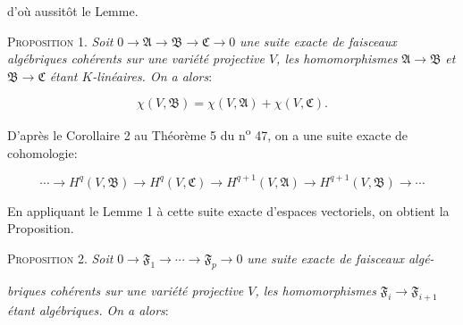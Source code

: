 d'où aussitôt le Lemme.

\textsc{Proposition} 1. \textit{Soit} $0 \rightarrow \mathfrak{A} \rightarrow \mathfrak{B} \rightarrow \mathfrak{C} \rightarrow 0$ \textit{une suite exacte de faisceaux algébriques cohérents sur une variété projective $V$, les homomorphismes} $\mathfrak{A} \rightarrow \mathfrak{B}$ \textit{et} $\mathfrak{B} \rightarrow \mathfrak{C}$ \textit{étant $K$-linéaires. On a alors}:

\begin{equation*}
\chi(V, \mathfrak{B}) = \chi(V, \mathfrak{A}) + \chi(V, \mathfrak{C}).
\end{equation*}

D'après le Corollaire 2 au Théorème 5 du n\textsuperscript{o} 47, on a une suite exacte de cohomologie:

\begin{equation*}
\cdots \rightarrow H^q(V, \mathfrak{B}) \rightarrow H^q(V, \mathfrak{C}) \rightarrow H^{q+1}(V, \mathfrak{A}) \rightarrow H^{q+1}(V, \mathfrak{B}) \rightarrow \cdots
\end{equation*}

En appliquant le Lemme 1 à cette suite exacte d'espaces vectoriels, on obtient la Proposition.

\textsc{Proposition} 2. \textit{Soit} $0 \rightarrow \mathfrak{F}_1 \rightarrow \cdots \rightarrow \mathfrak{F}_p \rightarrow 0$ \textit{une suite exacte de faisceaux algé-}



%
%
%
%
\textit{briques cohérents sur une variété projective $V$, les homomorphismes} $\mathfrak{F}_i \rightarrow \mathfrak{F}_{i+1}$ \textit{étant algébriques. On a alors}:

